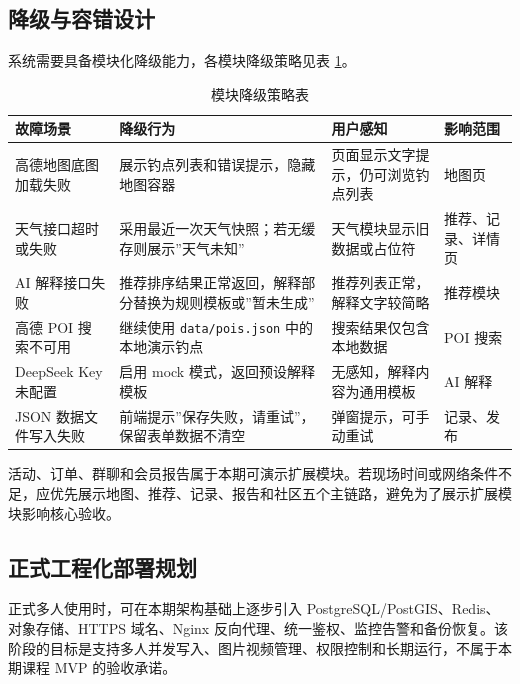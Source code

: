 \subsection{降级与容错设计}

系统需要具备模块化降级能力，各模块降级策略见表 \ref{tab:degradation}。

\begin{table}[htbp]
  \centering\small
  \caption{模块降级策略表}
  \label{tab:degradation}
  \begin{tabularx}{\textwidth}{>{\raggedright\arraybackslash}p{2.2cm}|X|>{\raggedright\arraybackslash}p{3.0cm}|>{\raggedright\arraybackslash}p{1.6cm}}
    \toprule
    \textbf{故障场景} & \textbf{降级行为} & \textbf{用户感知} & \textbf{影响范围} \\
    \midrule
    高德地图底图加载失败 & 展示钓点列表和错误提示，隐藏地图容器 & 页面显示文字提示，仍可浏览钓点列表 & 地图页 \\
    \hline
    天气接口超时或失败 & 采用最近一次天气快照；若无缓存则展示”天气未知” & 天气模块显示旧数据或占位符 & 推荐、记录、详情页 \\
    \hline
    AI 解释接口失败 & 推荐排序结果正常返回，解释部分替换为规则模板或”暂未生成” & 推荐列表正常，解释文字较简略 & 推荐模块 \\
    \hline
    高德 POI 搜索不可用 & 继续使用 \texttt{data/pois.json} 中的本地演示钓点 & 搜索结果仅包含本地数据 & POI 搜索 \\
    \hline
    DeepSeek Key 未配置 & 启用 mock 模式，返回预设解释模板 & 无感知，解释内容为通用模板 & AI 解释 \\
    \hline
    JSON 数据文件写入失败 & 前端提示”保存失败，请重试”，保留表单数据不清空 & 弹窗提示，可手动重试 & 记录、发布 \\
    \bottomrule
  \end{tabularx}
\end{table}

活动、订单、群聊和会员报告属于本期可演示扩展模块。若现场时间或网络条件不足，应优先展示地图、推荐、记录、报告和社区五个主链路，避免为了展示扩展模块影响核心验收。

\subsection{正式工程化部署规划}

正式多人使用时，可在本期架构基础上逐步引入 PostgreSQL/PostGIS、Redis、对象存储、HTTPS 域名、Nginx 反向代理、统一鉴权、监控告警和备份恢复。该阶段的目标是支持多人并发写入、图片视频管理、权限控制和长期运行，不属于本期课程 MVP 的验收承诺。

